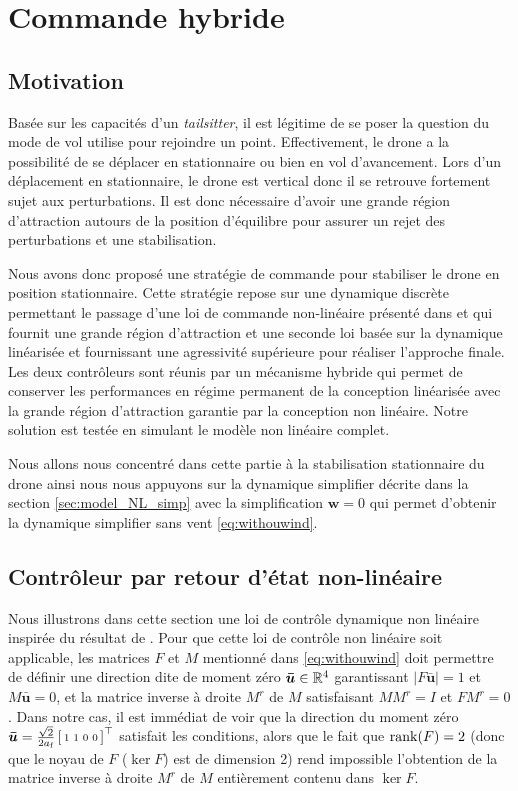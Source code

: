 
\chapter{Commande hybride}
\label{chap:hybrid}
\minitoc


\section{Motivation}
Basée sur les capacités d'un \textit{tailsitter}, il est légitime de se poser la question du mode de vol utilise pour rejoindre un point. Effectivement, le drone a la possibilité de se déplacer en stationnaire ou bien en vol d'avancement. Lors d'un déplacement en stationnaire, le drone est vertical donc il se retrouve fortement sujet aux perturbations. Il est donc nécessaire d'avoir une grande région d'attraction autours de la position d'équilibre pour assurer un rejet des perturbations et une stabilisation.

Nous avons donc proposé une stratégie de commande pour stabiliser le drone en position stationnaire. Cette stratégie repose sur une dynamique discrète permettant le passage d'une loi de commande non-linéaire présenté dans \cite{2020e-MicCenZacFra} et qui fournit une grande région d'attraction et une seconde loi basée sur la dynamique linéarisée et fournissant une agressivité supérieure pour réaliser l'approche finale. Les deux contrôleurs sont réunis par un mécanisme hybride qui permet de conserver les performances en régime permanent de la conception linéarisée avec la grande région d'attraction garantie par la conception non linéaire. Notre solution est testée en simulant le modèle non linéaire complet.

Nous allons nous concentré dans cette partie à la stabilisation stationnaire du drone ainsi nous nous appuyons sur la dynamique simplifier décrite dans la section \ref{sec:model_NL_simp} avec la simplification $\boldsymbol{w} = 0$ qui permet d'obtenir la dynamique simplifier sans vent \eqref{eq:withouwind}. 



\section{Contrôleur par retour d'état non-linéaire}
Nous illustrons dans cette section une loi de contrôle dynamique non linéaire inspirée du résultat de \cite{2020e-MicCenZacFra}. Pour que cette loi de contrôle non linéaire soit applicable, les matrices $F$ et $M$ mentionné dans \eqref{eq:withouwind} doit permettre de définir une direction dite de moment zéro $\boldsymbol{\bar u} \in {\mathbb R}^4$ garantissant
$|F\boldsymbol{\bar u}| = 1$ et $M \boldsymbol{\bar u}=0$, et la matrice inverse à droite $M^r$ de $M$ satisfaisant $M M^r = I$ et $FM^r=0$. Dans notre cas, il est immédiat de voir que la direction du moment zéro $\boldsymbol{\bar u} = \frac{\sqrt{2}}{2a_{\text{f}}}\left[ \begin{smallmatrix}1&1&0&0 \end{smallmatrix} \right]^\top$ satisfait les conditions, alors que le fait que $\operatorname{rank}(F) = 2$ (donc que le noyau de $F$ ($\ker F$) est de dimension 2) rend impossible l'obtention de la matrice inverse à droite $M^r$ de $M$ entièrement contenu dans $\ker F$.

